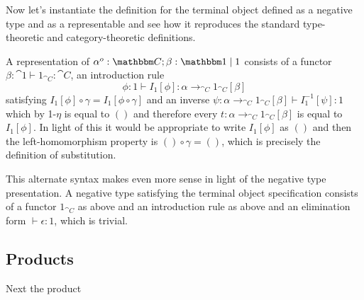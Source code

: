 \documentclass{article}
\begin{document}
Now let's instantiate the definition for the terminal object defined
as a negative type and as a representable and see how it reproduces
the standard type-theoretic and category-theoretic definitions.

A representation of $\alpha^o:\cat C; \beta : \cat 1 \pipe 1$ consists
of a functor $\beta : \cat 1 \vdash 1_{\cat C} : \cat C$, an introduction rule
\[ \phi : 1 \vdash I_{1}[\phi] : \alpha \to_{\cat C} 1_{\cat C}[\beta] \]
satisfying $I_{1}[\phi] \circ \gamma =I_{1}[\phi \circ \gamma]$ and an
inverse $\psi : \alpha \to_{\cat C} 1_{\cat C}[\beta] \vdash
I_{1}^{-1}[\psi] : 1$ which by \textsc{1-$\eta$} is equal to $()$ and
therefore every $t : \alpha \to_{\cat C} 1_{\cat C}[\beta]$ is equal
to $I_{1}[\phi]$. In light of this it would be appropriate to write
$I_1[\phi]$ as $()$ and then the left-homomorphism property is $()
\circ \gamma = ()$, which is precisely the definition of substitution.

This alternate syntax makes even more sense in light of the negative
type presentation. A negative type satisfying the terminal object
specification consists of a functor $1_{\cat C}$ as above and an
introduction rule as above and an elimination form $\vdash \epsilon :
1$, which is trivial.

\subsection{Products}

Next the product
\end{document}
